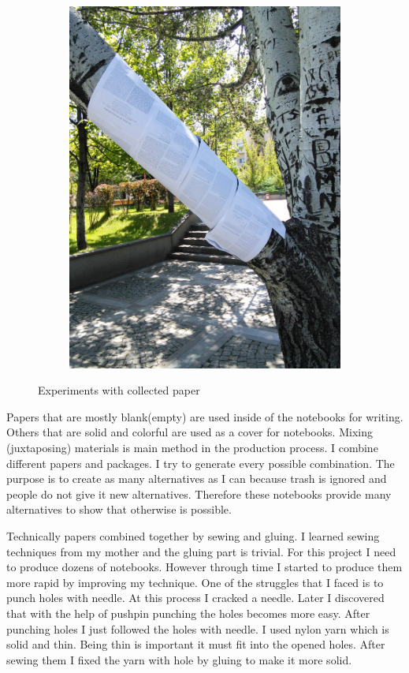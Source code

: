 \begin{figure}
\begin{subfigure}[b]{0.47\textwidth}
        \includegraphics[width=\textwidth]{project_graphics/tree_experiment2.jpg}
    \end{subfigure}
    \caption{Experiments with collected paper}
    \label{fig:ExperimentWithPaper}
\end{figure}

Papers that are mostly blank(empty) are used inside of the notebooks for writing. Others that are solid and colorful are used as a cover for notebooks. Mixing (juxtaposing) materials is main method in the production process. I combine different papers and packages. I try to generate every possible combination. The purpose is to create as many alternatives as I can because trash is ignored and people do not give it new alternatives. Therefore these notebooks provide many alternatives to show that otherwise is possible. 

Technically papers combined together by sewing and gluing. I learned sewing techniques from my mother and the gluing part is trivial. For this project I need to produce dozens of notebooks. However through time I started to produce them more rapid by improving my technique. One of the struggles that I faced is to punch holes with needle. At this process I cracked a needle. Later I discovered that with the help of pushpin punching the holes becomes more easy. After punching holes I just followed the holes with needle. I used nylon yarn which is solid and thin. Being thin is important it must fit into the opened holes. After sewing them I fixed the yarn with hole by gluing to make it more solid.

